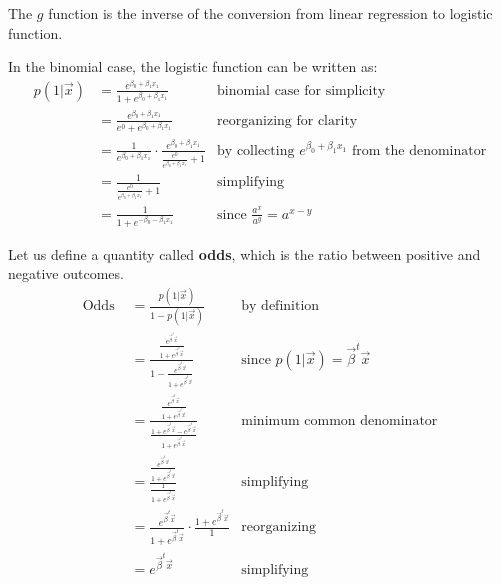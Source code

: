     
    The $g$ function is the inverse of the conversion from linear regression to logistic function.
    
    In the binomial case, the logistic function can be written as:
	\begin{align*}
	  p(1|\vec{x}) & = \frac{e^{\beta_0 + \beta_1 x_1}} {1+e^{\beta_0 + \beta_1 x_1}}
	               & \text{binomial case for simplicity} \\
	               & = \frac{e^{\beta_0 + \beta_1 x_1}} {e^0+e^{\beta_0 + \beta_1 x_1}}
	               & \text{reorganizing for clarity} \\
	               & = \frac{1}{e^{\beta_0 + \beta_1 x_1}} \cdot \frac{e^{\beta_0 + \beta_1 x_1}}{\frac{e^0}{e^{\beta_0 + \beta_1 x_1}} + 1}
	               & \text{by collecting } e^{\beta_0 + \beta_1 x_1} \text{ from the denominator}\\
	               & = \frac{1}{\frac{e^0}{e^{\beta_0 + \beta_1 x_1}} + 1} 
	               & \text{simplifying}\\ 
	               & = \frac{1}{1 + e^{-\beta_0 - \beta_1 x_1}}
	               & \text{since } \frac{a^x}{a^y} = a^{x-y}
	\end{align*}

	
    Let us define a quantity called \textbf{odds}, which is the ratio between positive and negative outcomes.
	\begin{align*}
	  \text{Odds } &= \frac{p(1|\vec{x})}{1 - p(1|\vec{x})}
	               & \text{by definition}\\
	               &= \frac{\frac{e^{\vec{\beta}^t\vec{x}}}{1 + e^{\vec{\beta}^t\vec{x}}}}
	                       {1 - \frac{e^{\vec{\beta}^t\vec{x}}}{1 + e^{\vec{\beta}^t\vec{x}}}}
	               & \text{since } p(1|\vec{x}) = \vec{\beta}^t\vec{x} \\
	               &= \frac{\frac{e^{\vec{\beta}^t\vec{x}}}{1 + e^{\vec{\beta}^t\vec{x}}}}
	                       {\frac{1 + e^{\vec{\beta}^t\vec{x}} - e^{\vec{\beta}^t\vec{x}}}{1 + e^{\vec{\beta}^t\vec{x}}}}
	               & \text{minimum common denominator}\\
	               &= \frac{\frac{e^{\vec{\beta}^t\vec{x}}}{1 + e^{\vec{\beta}^t\vec{x}}}}
	                       {\frac{1}{1 + e^{\vec{\beta}^t\vec{x}}}}
	               & \text{simplifying}\\
	               &= \frac{e^{\vec{\beta}^t\vec{x}}}{1 + e^{\vec{\beta}^t\vec{x}}} \cdot
	                       \frac{1 + e^{\vec{\beta}^t\vec{x}}}{1}
	               & \text{reorganizing}\\
	               &= e^{\vec{\beta}^t\vec{x}}
	               & \text{simplifying}\\
	\end{align*}
    
